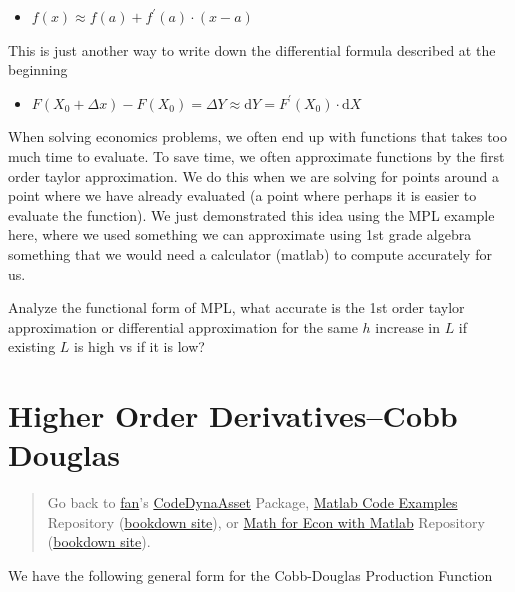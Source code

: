 \documentclass[
]{book}
\providecommand{\tightlist}{%
  \setlength{\itemsep}{0pt}\setlength{\parskip}{0pt}}
\begin{document}
\begin{itemize}
\tightlist
\item
  \(\displaystyle f(x)\approx f(a)+f^{\prime } (a)\cdot (x-a)\)
\end{itemize}

This is just another way to write down the differential formula
described at the beginning

\begin{itemize}
\tightlist
\item
  \(\displaystyle F(X_0 +\Delta x)-F(X_0 )=\Delta Y\approx \textrm{d}Y=F^{\prime } (X_0 )\cdot \textrm{d}X\)
\end{itemize}

When solving economics problems, we often end up with functions that
takes too much time to evaluate. To save time, we often approximate
functions by the first order taylor approximation. We do this when we
are solving for points around a point where we have already evaluated (a
point where perhaps it is easier to evaluate the function). We just
demonstrated this idea using the MPL example here, where we used
something we can approximate using 1st grade algebra something that we
would need a calculator (matlab) to compute accurately for us.

Analyze the functional form of MPL, what accurate is the 1st order
taylor approximation or differential approximation for the same \(h\)
increase in \(L\) if existing \(L\) is high vs if it is low?

\hypertarget{higher-order-derivativescobb-douglas}{%
\section{Higher Order Derivatives--Cobb Douglas}\label{higher-order-derivativescobb-douglas}}

\begin{quote}
Go back to \href{http://fanwangecon.github.io/}{fan}'s \href{https://fanwangecon.github.io/CodeDynaAsset/}{CodeDynaAsset} Package, \href{https://fanwangecon.github.io/M4Econ/}{Matlab Code Examples} Repository (\href{https://fanwangecon.github.io/M4Econ/bookdown}{bookdown site}), or \href{https://fanwangecon.github.io/Math4Econ/}{Math for Econ with Matlab} Repository (\href{https://fanwangecon.github.io/Math4Econ/bookdown}{bookdown site}).
\end{quote}

We have the following general form for the Cobb-Douglas Production
Function
\end{document}

